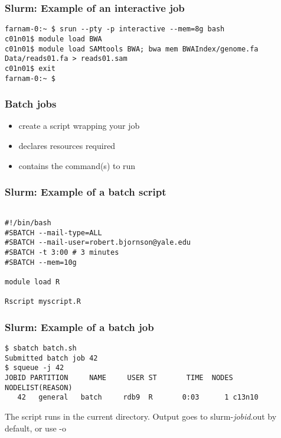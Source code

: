 \documentclass[10pt]{beamer}
\newcommand\smallfont{\fontsize{8pt}{7.2}\selectfont}
\newcommand\regfont{\fontsize{10pt}{7.2}\selectfont}
\begin{document}
\begin{frame}[fragile]
\frametitle{Slurm: Example of an interactive job}
\begin{verbatim}
farnam-0:~ $ srun --pty -p interactive --mem=8g bash
c01n01$ module load BWA
c01n01$ module load SAMtools BWA; bwa mem BWAIndex/genome.fa Data/reads01.fa > reads01.sam
c01n01$ exit
farnam-0:~ $
\end{verbatim}
\end{frame}

\begin{frame}[fragile]
\frametitle{Batch jobs}
\begin{itemize}
\item create a script wrapping your job
\item declares resources required
\item contains the command(s) to run
\end{itemize}

\end{frame}

\begin{frame}[fragile]
\frametitle{Slurm: Example of a batch script}

\begin{block}{}
\begin{verbatim}

#!/bin/bash
#SBATCH --mail-type=ALL
#SBATCH --mail-user=robert.bjornson@yale.edu
#SBATCH -t 3:00 # 3 minutes
#SBATCH --mem=10g

module load R

Rscript myscript.R
\end{verbatim}
\end{block}{}
\end{frame}

\begin{frame}[fragile]
\frametitle{Slurm: Example of a batch job}
\smallfont
\begin{verbatim}
$ sbatch batch.sh
Submitted batch job 42
$ squeue -j 42
JOBID PARTITION     NAME     USER ST       TIME  NODES NODELIST(REASON)
   42   general   batch     rdb9  R       0:03      1 c13n10
\end{verbatim}
\vskip14pt
\regfont
The script runs in the current directory.  
Output goes to slurm-\textit{jobid}.out by default, or use -o
\end{frame}
\end{document}
